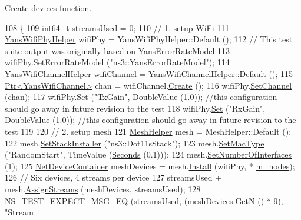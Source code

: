Create devices function. 


\begin{DoxyCode}
108 \{
109   int64\_t streamsUsed = 0;
110   \textcolor{comment}{// 1. setup WiFi}
111   \hyperlink{classns3_1_1YansWifiPhyHelper}{YansWifiPhyHelper} wifiPhy = YansWifiPhyHelper::Default ();
112   \textcolor{comment}{// This test suite output was originally based on YansErrorRateModel}
113   wifiPhy.\hyperlink{classns3_1_1WifiPhyHelper_a219d3ae5881842aa42ea341b985ce114}{SetErrorRateModel} (\textcolor{stringliteral}{"ns3::YansErrorRateModel"});
114   \hyperlink{classns3_1_1YansWifiChannelHelper}{YansWifiChannelHelper} wifiChannel = YansWifiChannelHelper::Default ();
115   \hyperlink{classns3_1_1Ptr}{Ptr<YansWifiChannel>} chan = wifiChannel.\hyperlink{classns3_1_1YansWifiChannelHelper_a0532e292ab9452f3cf630c848708e563}{Create} ();
116   wifiPhy.\hyperlink{classns3_1_1YansWifiPhyHelper_ad2e9a27587dd4ff320435c93cc2676de}{SetChannel} (chan);
117   wifiPhy.\hyperlink{classns3_1_1WifiPhyHelper_a2527d6d7b29f717fd7436166c5f05f1a}{Set} (\textcolor{stringliteral}{"TxGain"}, DoubleValue (1.0)); \textcolor{comment}{//this configuration should go away in future revision to
       the test}
118   wifiPhy.\hyperlink{classns3_1_1WifiPhyHelper_a2527d6d7b29f717fd7436166c5f05f1a}{Set} (\textcolor{stringliteral}{"RxGain"}, DoubleValue (1.0)); \textcolor{comment}{//this configuration should go away in future revision to
       the test}
119 
120   \textcolor{comment}{// 2. setup mesh}
121   \hyperlink{classns3_1_1MeshHelper}{MeshHelper} mesh = MeshHelper::Default ();
122   mesh.\hyperlink{classns3_1_1MeshHelper_ac1074aff829d0cde1659bdef572880ca}{SetStackInstaller} (\textcolor{stringliteral}{"ns3::Dot11sStack"});
123   mesh.\hyperlink{classns3_1_1MeshHelper_a549d568927a88e95a721f2be58232c10}{SetMacType} (\textcolor{stringliteral}{"RandomStart"}, TimeValue (\hyperlink{group__timecivil_ga33c34b816f8ff6628e33d5c8e9713b9e}{Seconds} (0.1)));
124   mesh.\hyperlink{classns3_1_1MeshHelper_adfc08b62a8d6e835d0fbbac7a349ef5f}{SetNumberOfInterfaces} (1);
125   \hyperlink{classns3_1_1NetDeviceContainer}{NetDeviceContainer} meshDevices = mesh.\hyperlink{classns3_1_1MeshHelper_a7b33f6ca7b6842b3def4479bc7526f2c}{Install} (wifiPhy, *
      \hyperlink{classHwmpReactiveRegressionTest_a2b8250bd4d0555240ec552e57480ae7c}{m\_nodes});
126   \textcolor{comment}{// Six devices, 4 streams per device}
127   streamsUsed += mesh.\hyperlink{classns3_1_1MeshHelper_a93e9c88a375a86c621a494aafe68882e}{AssignStreams} (meshDevices, streamsUsed);
128   \hyperlink{group__testing_ga7304ba46a28d8cf08dfdfd6499cf7068}{NS\_TEST\_EXPECT\_MSG\_EQ} (streamsUsed, (meshDevices.\hyperlink{classns3_1_1NetDeviceContainer_a74cafc212479bc38976bebd118e856b9}{GetN} () * 9), \textcolor{stringliteral}{"Stream
}
\end{DoxyCode}
